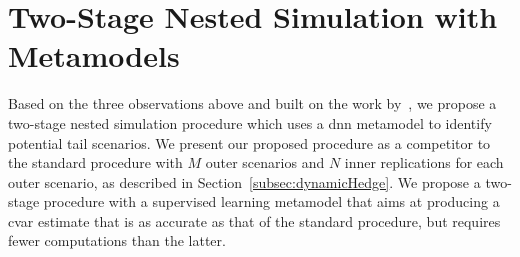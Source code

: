\section{Two-Stage Nested Simulation with Metamodels} \label{sec2:metamodel2Stage}

Based on the three observations above and built on the work by~\cite{dang2020efficient}, we propose a two-stage nested simulation procedure which uses a \gls{dnn} metamodel to identify potential tail scenarios.
We present our proposed procedure as a competitor to the standard procedure with $M$ outer scenarios and $N$ inner replications for each outer scenario, as described in Section~\ref{subsec:dynamicHedge}.
We propose a two-stage procedure with a supervised learning metamodel that aims at producing a \gls{cvar} estimate that is as accurate as that of the standard procedure, but requires fewer computations than the latter.

